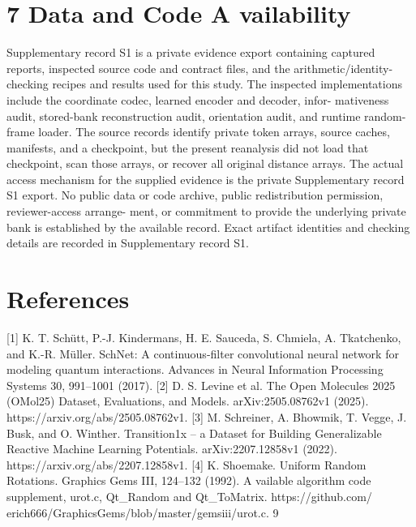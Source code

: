 \documentclass[11pt]{article}
\begin{document}
\section*{7 Data and Code A vailability}

Supplementary record S1 is a private evidence export containing captured reports, inspected source
code and contract files, and the arithmetic/identity-checking recipes and results used for this study.
The inspected implementations include the coordinate codec, learned encoder and decoder, infor-
mativeness audit, stored-bank reconstruction audit, orientation audit, and runtime random-frame
loader. The source records identify private token arrays, source caches, manifests, and a checkpoint,
but the present reanalysis did not load that checkpoint, scan those arrays, or recover all original
distance arrays.
The actual access mechanism for the supplied evidence is the private Supplementary record S1
export. No public data or code archive, public redistribution permission, reviewer-access arrange-
ment, or commitment to provide the underlying private bank is established by the available record.
Exact artifact identities and checking details are recorded in Supplementary record S1.

\section*{References}

[1] K. T. Schütt, P.-J. Kindermans, H. E. Sauceda, S. Chmiela, A. Tkatchenko, and K.-R. Müller.
SchNet: A continuous-filter convolutional neural network for modeling quantum interactions.
Advances in Neural Information Processing Systems 30, 991–1001 (2017).
[2] D. S. Levine et al. The Open Molecules 2025 (OMol25) Dataset, Evaluations, and Models.
arXiv:2505.08762v1 (2025). https://arxiv.org/abs/2505.08762v1.
[3] M. Schreiner, A. Bhowmik, T. Vegge, J. Busk, and O. Winther. Transition1x – a Dataset
for Building Generalizable Reactive Machine Learning Potentials. arXiv:2207.12858v1 (2022).
https://arxiv.org/abs/2207.12858v1.
[4] K. Shoemake. Uniform Random Rotations. Graphics Gems III, 124–132 (1992). A vailable
algorithm code supplement, urot.c, Qt\_Random and Qt\_ToMatrix. https://github.com/
erich666/GraphicsGems/blob/master/gemsiii/urot.c.
9
\end{document}
